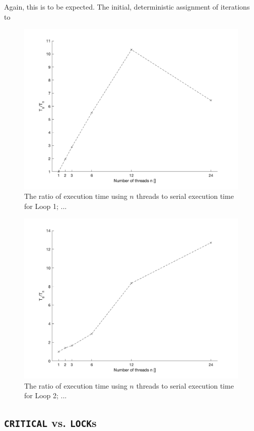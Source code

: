 \documentclass{article} %
\newcommand{\tp}{\texttt}
\begin{document}
Again, this is to be expected. The initial, deterministic assignment of iterations to 

\begin{figure}
    \centering
    \includegraphics[width=.8\textwidth]{part2_plots/speedup_affinity_loop1.png}
    \caption{The ratio of execution time using $n$ threads to serial execution time for Loop 1; ...}
\end{figure}

\begin{figure}
    \centering
    \includegraphics[width=.8\textwidth]{part2_plots/speedup_affinity_loop2.png}
    \caption{The ratio of execution time using $n$ threads to serial execution time for Loop 2; ...}
\end{figure}


\subsection*{\tp{CRITICAL} vs. \tp{LOCK}s}\label{s:locks}
\end{document}
